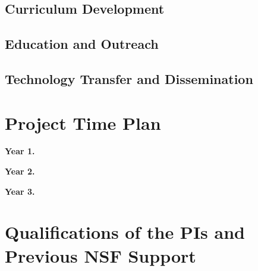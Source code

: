 \documentclass[letterpaper,twoside,11pt,headings=small]{scrartcl}
\renewcommand{\paragraph}[1]{{\sffamily\textbf{#1}}~}
\begin{document}
\subsection{Curriculum Development}
\label{sec:impact:curriculum}

\subsection{Education and Outreach}
\label{sec:impact:education}

\subsection{Technology Transfer and Dissemination}
\label{sec:impact:tech-transfer}

\section{Project Time Plan}
\label{sec:time-plan}

\paragraph{Year 1.}

\paragraph{Year 2.}

\paragraph{Year 3.}

\section{Qualifications of the PIs and Previous NSF Support}
\label{sec:qualifications}

\newpage
{}
\setcounter{page}{1}



\newpage
{}
\setcounter{page}{1}
\setcounter{section}{0}
\end{document}
